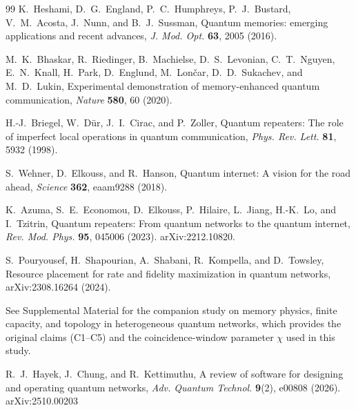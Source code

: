 \documentclass[aps,prapplied,reprint,superscriptaddress]{revtex4-2}
\begin{document}
\begin{thebibliography}{99}
K.~Heshami, D.~G.~England, P.~C.~Humphreys, P.~J.~Bustard, V.~M.~Acosta, J.~Nunn, and B.~J.~Sussman,
Quantum memories: emerging applications and recent advances,
\textit{J. Mod. Opt.} \textbf{63}, 2005 (2016).

M.~K.~Bhaskar, R.~Riedinger, B.~Machielse, D.~S.~Levonian, C.~T.~Nguyen, E.~N.~Knall, H.~Park, D.~Englund, M.~Lon{\v{c}}ar, D.~D.~Sukachev, and M.~D.~Lukin,
Experimental demonstration of memory-enhanced quantum communication,
\textit{Nature} \textbf{580}, 60 (2020).

H.-J.~Briegel, W.~D\"ur, J.~I.~Cirac, and P.~Zoller,
Quantum repeaters: The role of imperfect local operations in quantum communication,
\textit{Phys. Rev. Lett.} \textbf{81}, 5932 (1998).

S.~Wehner, D.~Elkouss, and R.~Hanson,
Quantum internet: A vision for the road ahead,
\textit{Science} \textbf{362}, eaam9288 (2018).

K.~Azuma, S.~E.~Economou, D.~Elkouss, P.~Hilaire, L.~Jiang, H.-K.~Lo, and I.~Tzitrin,
Quantum repeaters: From quantum networks to the quantum internet,
\emph{Rev. Mod. Phys.} \textbf{95}, 045006 (2023). arXiv:2212.10820.

S.~Pouryousef, H.~Shapourian, A.~Shabani, R.~Kompella, and D.~Towsley,
Resource placement for rate and fidelity maximization in quantum networks,
arXiv:2308.16264 (2024).

See Supplemental Material for the companion study on memory physics, finite capacity, and topology in heterogeneous quantum networks, which provides the original claims (C1--C5) and the coincidence-window parameter $\chi$ used in this study.

R.~J.~Hayek, J.~Chung, and R.~Kettimuthu,
A review of software for designing and operating quantum networks,
\textit{Adv. Quantum Technol.} \textbf{9}(2), e00808 (2026).
arXiv:2510.00203

\end{thebibliography}
\end{document}
